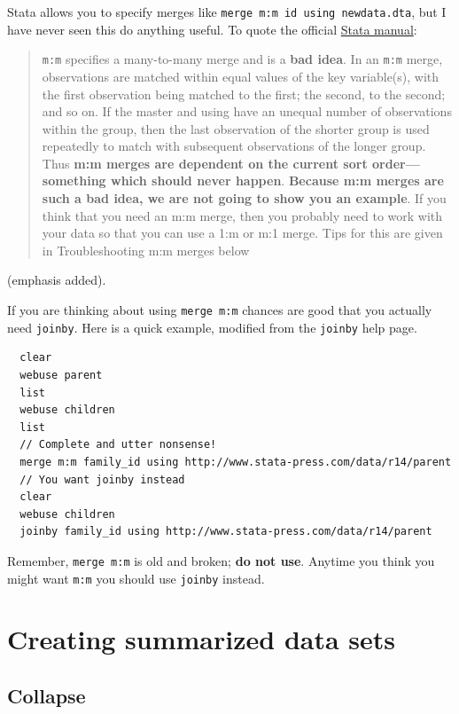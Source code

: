 \documentclass[]{book}
\begin{document}
Stata allows you to specify merges like
\texttt{merge\ m:m\ id\ using\ newdata.dta}, but I have never seen this
do anything useful. To quote the official
\href{https://www.stata.com/manuals13/dmerge.pdf}{Stata manual}:

\begin{quote}
\texttt{m:m} specifies a many-to-many merge and is a \textbf{bad idea}.
In an \texttt{m:m} merge, observations are matched within equal values
of the key variable(s), with the first observation being matched to the
first; the second, to the second; and so on. If the master and using
have an unequal number of observations within the group, then the last
observation of the shorter group is used repeatedly to match with
subsequent observations of the longer group. Thus \textbf{m:m merges are
dependent on the current sort order---something which should never
happen}. \textbf{Because m:m merges are such a bad idea, we are not
going to show you an example}. If you think that you need an m:m merge,
then you probably need to work with your data so that you can use a 1:m
or m:1 merge. Tips for this are given in Troubleshooting m:m merges
below
\end{quote}

(emphasis added).

If you are thinking about using \texttt{merge\ m:m} chances are good
that you actually need \texttt{joinby}. Here is a quick example,
modified from the \texttt{joinby} help page.

\begin{verbatim}
  clear
  webuse parent
  list
  webuse children
  list
  // Complete and utter nonsense!
  merge m:m family_id using http://www.stata-press.com/data/r14/parent 
  // You want joinby instead
  clear
  webuse children
  joinby family_id using http://www.stata-press.com/data/r14/parent 
\end{verbatim}

Remember, \texttt{merge\ m:m} is old and broken; \textbf{do not use}.
Anytime you think you might want \texttt{m:m} you should use
\texttt{joinby} instead.

\section{Creating summarized data
sets}\label{creating-summarized-data-sets}

\subsection{Collapse}\label{collapse}
\end{document}
